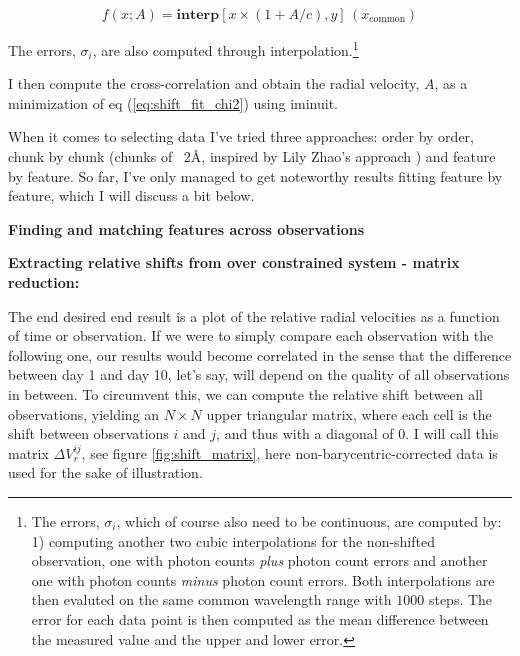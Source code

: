     \begin{equation}
        f(x; A) = \textbf{interp}[x \times ( 1 + A/c), y]\,(x_\text{common})
    \end{equation}

    The errors, $\sigma_i$, are also computed through interpolation.\footnote{The errors, $\sigma_i$, which of course also need to be continuous, are computed by: 1) computing another two cubic interpolations for the non-shifted observation, one with photon counts \emph{plus} photon count errors and another one with photon counts \emph{minus} photon count errors. Both interpolations are then evaluted on the same common wavelength range with $1000$ steps. The error for each data point is then computed as the mean difference between the measured value and the upper and lower error.}
    
    I then compute the cross-correlation and obtain the radial velocity, $A$, as a minimization of eq (\ref{eq:shift_fit_chi2}) using iminuit.

    When it comes to selecting data I've tried three approaches: order by order, chunk by chunk (chunks of ~2Å, inspired by Lily Zhao's approach \cite{first_RV_from_EXPRES}) and feature by feature. So far, I've only managed to get noteworthy results fitting feature by feature, which I will discuss a bit below. 
    
    \bigbreak
    \noindent\textbf{Finding and matching features across observations}

    
    \todo{}

    \bigbreak
    \noindent\textbf{Extracting relative shifts from over constrained system - matrix reduction:}
    
    The end desired end result is a plot of the relative radial velocities as a function of time or observation. If we were to simply compare each observation with the following one, our results would become correlated in the sense that the difference between day 1 and day 10, let's say, will depend on the quality of all observations in between. To circumvent this, we can compute the relative shift between all observations, yielding an $N\times N$ upper triangular matrix, where each cell is the shift between observations $i$ and $j$, and thus with a diagonal of 0. I will call this matrix $\Delta V_r^{ij}$, see figure \ref*{fig:shift_matrix}, here non-barycentric-corrected data is used for the sake of illustration. 
    
